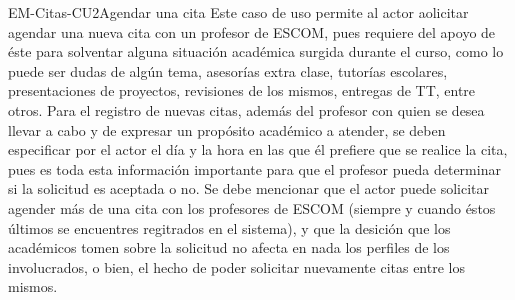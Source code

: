 \begin{UseCase}{EM-Citas-CU2}{Agendar una cita}{
	\noindent
	Este caso de uso permite al actor aolicitar agendar una nueva cita con un profesor de ESCOM, pues requiere del apoyo de éste para solventar alguna situación académica surgida durante el curso, como lo puede ser dudas de algún tema, asesorías extra clase, tutorías escolares, presentaciones de proyectos, revisiones de los mismos, entregas de TT, entre otros.
	\newline
	Para el registro de nuevas citas, además del profesor con quien se desea llevar a cabo y de expresar un propósito académico a atender, se deben especificar por el actor el día y la hora en las que él prefiere que se realice la cita, pues es toda esta información importante para que el profesor pueda determinar si la solicitud es aceptada o no.
	\newline
	Se debe mencionar que el actor puede solicitar agender más de una cita con los profesores de ESCOM (siempre y cuando éstos últimos se encuentres regitrados en el sistema), y que la desición que los académicos tomen sobre la solicitud no afecta en nada los perfiles de los involucrados, o bien, el hecho de poder solicitar nuevamente citas entre los mismos.
	}
\end{UseCase}

